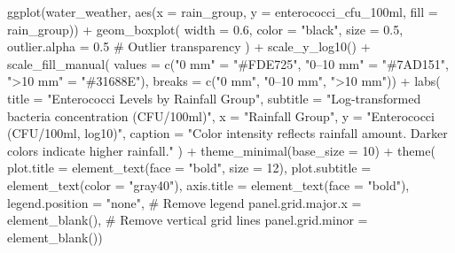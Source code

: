 \documentclass[
  11pt,
]{article}
\newenvironment{Shaded}{\begin{snugshade}}{\end{snugshade}}
\newcommand{\AttributeTok}[1]{\textcolor[rgb]{0.40,0.45,0.13}{#1}}
\newcommand{\CommentTok}[1]{\textcolor[rgb]{0.37,0.37,0.37}{#1}}
\newcommand{\DecValTok}[1]{\textcolor[rgb]{0.68,0.00,0.00}{#1}}
\newcommand{\FloatTok}[1]{\textcolor[rgb]{0.68,0.00,0.00}{#1}}
\newcommand{\FunctionTok}[1]{\textcolor[rgb]{0.28,0.35,0.67}{#1}}
\newcommand{\NormalTok}[1]{\textcolor[rgb]{0.00,0.23,0.31}{#1}}
\newcommand{\OtherTok}[1]{\textcolor[rgb]{0.00,0.23,0.31}{#1}}
\newcommand{\SpecialCharTok}[1]{\textcolor[rgb]{0.37,0.37,0.37}{#1}}
\newcommand{\StringTok}[1]{\textcolor[rgb]{0.13,0.47,0.30}{#1}}
\begin{document}
\begin{Shaded}
\begin{Highlighting}[]
\FunctionTok{ggplot}\NormalTok{(water\_weather, }
       \FunctionTok{aes}\NormalTok{(}\AttributeTok{x =}\NormalTok{ rain\_group, }
           \AttributeTok{y =}\NormalTok{ enterococci\_cfu\_100ml, }
           \AttributeTok{fill =}\NormalTok{ rain\_group)) }\SpecialCharTok{+}  
  \FunctionTok{geom\_boxplot}\NormalTok{(}
    \AttributeTok{width =} \FloatTok{0.6}\NormalTok{,                }
    \AttributeTok{color =} \StringTok{"black"}\NormalTok{,            }
    \AttributeTok{size =} \FloatTok{0.5}\NormalTok{,                 }
    \AttributeTok{outlier.alpha =} \FloatTok{0.5}   \CommentTok{\# Outlier transparency}
\NormalTok{  ) }\SpecialCharTok{+}
  \FunctionTok{scale\_y\_log10}\NormalTok{() }\SpecialCharTok{+}
  \FunctionTok{scale\_fill\_manual}\NormalTok{(}
    \AttributeTok{values =} \FunctionTok{c}\NormalTok{(}\StringTok{"0 mm"} \OtherTok{=} \StringTok{"\#FDE725"}\NormalTok{,    }
               \StringTok{"0–10 mm"} \OtherTok{=} \StringTok{"\#7AD151"}\NormalTok{,}
               \StringTok{"\textgreater{}10 mm"} \OtherTok{=} \StringTok{"\#31688E"}\NormalTok{), }
    \AttributeTok{breaks =} \FunctionTok{c}\NormalTok{(}\StringTok{"0 mm"}\NormalTok{, }\StringTok{"0–10 mm"}\NormalTok{, }\StringTok{"\textgreater{}10 mm"}\NormalTok{)) }\SpecialCharTok{+}
  \FunctionTok{labs}\NormalTok{(}
    \AttributeTok{title =} \StringTok{"Enterococci Levels by Rainfall Group"}\NormalTok{,}
    \AttributeTok{subtitle =} \StringTok{"Log{-}transformed bacteria concentration (CFU/100ml)"}\NormalTok{,}
    \AttributeTok{x =} \StringTok{"Rainfall Group"}\NormalTok{,}
    \AttributeTok{y =} \StringTok{"Enterococci (CFU/100ml, log10)"}\NormalTok{,}
    \AttributeTok{caption =} \StringTok{"Color intensity reflects rainfall amount. Darker colors indicate higher rainfall."}
\NormalTok{  ) }\SpecialCharTok{+}
  \FunctionTok{theme\_minimal}\NormalTok{(}\AttributeTok{base\_size =} \DecValTok{10}\NormalTok{) }\SpecialCharTok{+}
  \FunctionTok{theme}\NormalTok{(}
    \AttributeTok{plot.title =} \FunctionTok{element\_text}\NormalTok{(}\AttributeTok{face =} \StringTok{"bold"}\NormalTok{, }\AttributeTok{size =} \DecValTok{12}\NormalTok{),}
    \AttributeTok{plot.subtitle =} \FunctionTok{element\_text}\NormalTok{(}\AttributeTok{color =} \StringTok{"gray40"}\NormalTok{),}
    \AttributeTok{axis.title =} \FunctionTok{element\_text}\NormalTok{(}\AttributeTok{face =} \StringTok{"bold"}\NormalTok{),}
    \AttributeTok{legend.position =} \StringTok{"none"}\NormalTok{,     }\CommentTok{\# Remove legend}
    \AttributeTok{panel.grid.major.x =} \FunctionTok{element\_blank}\NormalTok{(), }\CommentTok{\# Remove vertical grid lines}
    \AttributeTok{panel.grid.minor =} \FunctionTok{element\_blank}\NormalTok{())}
\end{Highlighting}
\end{Shaded}
\end{document}
